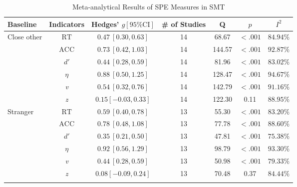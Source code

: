 \documentclass[sn-apa]{sn-jnl}%
\theoremstyle{thmstyleone}%
\theoremstyle{thmstyletwo}%
\theoremstyle{thmstylethree}%
\begin{document}
\begin{table}[!htbp]
	\caption{Meta-analytical Results of SPE Measures in SMT}\label{table:metaresult}
	\label{table:Meta}%
	\begin{tabular}{@{}lcccccc@{}}
		\toprule
		Baseline & Indicators & Hedges’ $g[95\% \text{CI}]$& \# of Studies & Q & $p$ & $I^2$\\
		\midrule
		Close other&  $\text{RT}$& $0.47\ [0.30, 0.63]$& 14& 68.67 & $<.001$& $84.94\%$ \\
		&  $\text{ACC}$ & $0.73\ [0.42, 1.03]$& 14&144.57&$<.001$& $92.87\%$ \\
		&  $d'$ &$0.44\ [0.28, 0.59] $&14&81.96&$<.001$&$83.02\%$ \\
		&  $\eta$ & $0.88\ [0.50, 1.25]$&14&128.47&$<.001$&$94.67\%$ \\
		&  \textit{v} &$0.54\ [0.32, 0.76]$ &14&142.79&$<.001$&$91.16\%$ \\
		&  \textit{z} & $0.15 [-0.03, 0.33]$&14&122.30&0.11&$88.95\%$ \\
		
		Stranger &  $\text{RT}$ &$0.59\ [0.40, 0.78]$ &13&55.30&$<.001$&$83.20\%$ \\
		&  $\text{ACC}$ &$0.78\ [0.48, 1.08]$ &13&77.78&$<.001$&$88.60\%$ \\
		&  $d'$ & $0.35\ [0.21, 0.50]$ &13&47.81&$<.001$&$75.38\%$ \\
		&  $\eta$ & $0.92\ [0.56, 1.29]$&13&98.79&$<.001$&$93.30\%$ \\
		&  \textit{v} & $0.44\ [0.28, 0.59]$&13&50.98&$<.001$&$79.33\%$ \\
		&  \textit{z} & $0.08 [-0.09, 0.24]$&13&70.48&0.37&$84.44\%$ \\
		\botrule
	\end{tabular}
\end{table}
\end{document}
